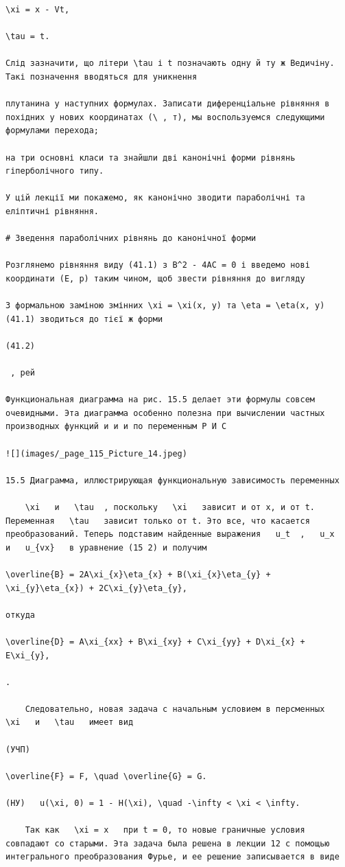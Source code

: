 \documentclass[
  ukrainian,
]{article}
\begin{document}
\begin{verbatim}
\xi = x - Vt,

\tau = t.

Слід зазначити, що літери \tau і t позначають одну й ту ж Ведичіну. Такі позначення вводяться для уникнення

плутанина у наступних формулах. Записати диференціальне рівняння в похідних у нових координатах (\ , т), мы воспользуемся следующими формулами перехода;

на три основні класи та знайшли дві канонічні форми рівнянь гіперболічного типу.

У цій лекції ми покажемо, як канонічно зводити параболічні та еліптичні рівняння.

# Зведення параболічних рівнянь до канонічної форми

Розглянемо рівняння виду (41.1) з B^2 - 4AC = 0 і введемо нові координати (E, p) таким чином, щоб звести рівняння до вигляду

З формальною заміною змінних \xi = \xi(x, y) та \eta = \eta(x, y) (41.1) зводиться до тієї ж форми

(41.2)

 , рей

Функциональная диаграмма на рис. 15.5 делает эти формулы совсем очевидными. Эта диаграмма особенно полезна при вычислении частных производных функций и и и по переменным Р И С

![](images/_page_115_Picture_14.jpeg)

15.5 Диаграмма, иллюстрирующая функциональную зависимость переменных

    \xi   и   \tau  , поскольку   \xi   зависит и от x, и от t. Переменная   \tau   зависит только от t. Это все, что касается преобразований. Теперь подставим найденные выражения   u_t  ,   u_x   и   u_{vx}   в уравнение (15 2) и получим

\overline{B} = 2A\xi_{x}\eta_{x} + B(\xi_{x}\eta_{y} + \xi_{y}\eta_{x}) + 2C\xi_{y}\eta_{y},

откуда

\overline{D} = A\xi_{xx} + B\xi_{xy} + C\xi_{yy} + D\xi_{x} + E\xi_{y},

.

    Следовательно, новая задача с начальным условием в персменных   \xi   и   \tau   имеет вид

(УЧП)

\overline{F} = F, \quad \overline{G} = G.

(НУ)   u(\xi, 0) = 1 - H(\xi), \quad -\infty < \xi < \infty.

    Так как   \xi = x   при t = 0, то новые граничные условия совпадают со старыми. Эта задача была решена в лекции 12 с помощью интегрального преобразования Фурье, и ее решение записывается в виде


\end{verbatim}
\end{document}
